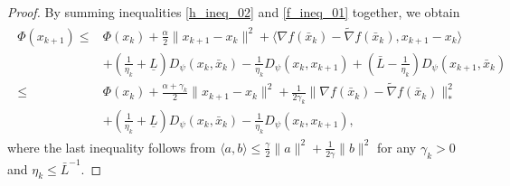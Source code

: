 \documentclass[letterpaper]{article} %
\begin{document}
\begin{proof}
		
		
		By summing inequalities \eqref{h_ineq_02} and \eqref{f_ineq_01} together, we obtain
		\begin{eqnarray}
			\begin{aligned}
				\Phi(x_{k+1})\le &\Phi(x_{k}) +\frac{\alpha}{2}\|x_{k+1}-x_{k}\|^{2}+\langle \nabla f(\bar{x}_{k})-\tilde{\nabla} f(\bar{x}_{k}), x_{k+1}-x_{k}\rangle\\
				&+\left(\frac{1}{\eta_{k}}+\underline{L}\right)D_{\psi}(x_{k},\bar{x}_{k}) -\frac{1}{\eta_{k}}D_{\psi}(x_{k},x_{k+1})+\left(\bar{L}-\frac{1}{\eta_{k}}\right)D_{\psi}(x_{k+1},\bar{x}_{k})\\
				\le&\Phi(x_{k}) +\frac{\alpha+\gamma_{k}}{2}\|x_{k+1}-x_{k}\|^{2}+\frac{1}{2\gamma_{k}}\|\nabla f(\bar{x}_{k})-\tilde{\nabla} f(\bar{x}_{k})\|_{*}^{2}\\
				&+\left(\frac{1}{\eta_{k}}+\underline{L}\right)D_{\psi}(x_{k},\bar{x}_{k}) -\frac{1}{\eta_{k}}D_{\psi}(x_{k},x_{k+1}),
			\end{aligned}
		\end{eqnarray}
		where the last inequality follows from $\langle a,b\rangle \le \frac{\gamma}{2}\|a\|^{2}+\frac{1}{2\gamma}\|b\|^{2}$ for any $\gamma_k>0$ and $\eta_{k}\le \bar{L}^{-1}$. 
		

\end{proof}
\end{document}
